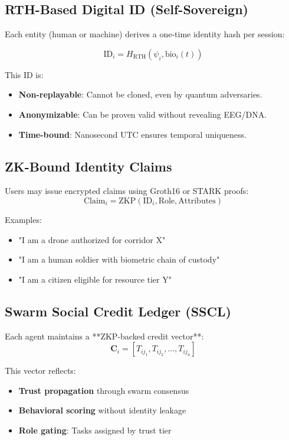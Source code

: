 \documentclass{article}
\begin{document}
\subsection*{RTH-Based Digital ID (Self-Sovereign)}

Each entity (human or machine) derives a one-time identity hash per session:

\[
\text{ID}_i = H_{\text{RTH}}(\psi_i, \text{bio}_i(t))
\]

This ID is:
\begin{itemize}
    \item \textbf{Non-replayable}: Cannot be cloned, even by quantum adversaries.
    \item \textbf{Anonymizable}: Can be proven valid without revealing EEG/DNA.
    \item \textbf{Time-bound}: Nanosecond UTC ensures temporal uniqueness.
\end{itemize}

\subsection*{ZK-Bound Identity Claims}

Users may issue encrypted claims using Groth16 or STARK proofs:
\[
\text{Claim}_i = \text{ZKP}(\text{ID}_i, \text{Role}, \text{Attributes})
\]

Examples:
\begin{itemize}
    \item "I am a drone authorized for corridor X"
    \item "I am a human soldier with biometric chain of custody"
    \item "I am a citizen eligible for resource tier Y"
\end{itemize}

\subsection*{Swarm Social Credit Ledger (SSCL)}

Each agent maintains a **ZKP-backed credit vector**:
\[
\mathbf{C}_i = \left[ T_{ij_1}, T_{ij_2}, \dots, T_{ij_n} \right]
\]

This vector reflects:
\begin{itemize}
    \item \textbf{Trust propagation} through swarm consensus
    \item \textbf{Behavioral scoring} without identity leakage
    \item \textbf{Role gating}: Tasks assigned by trust tier
\end{itemize}
\end{document}
